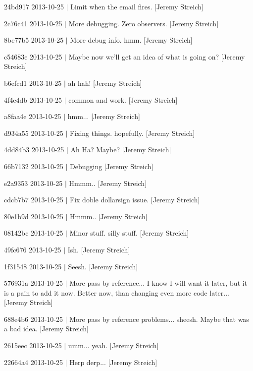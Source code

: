 \begin{DoxyItemize}
\item 24bd917 2013-\/10-\/25 $|$ Limit when the email fires. \mbox{[}Jeremy Streich\mbox{]}
\item 2c76c41 2013-\/10-\/25 $|$ More debugging. Zero observers. \mbox{[}Jeremy Streich\mbox{]}
\item 8be77b5 2013-\/10-\/25 $|$ More debug info. hmm. \mbox{[}Jeremy Streich\mbox{]}
\item c54683e 2013-\/10-\/25 $|$ Maybe now we'll get an idea of what is going on? \mbox{[}Jeremy Streich\mbox{]}
\item b6efcd1 2013-\/10-\/25 $|$ ah hah! \mbox{[}Jeremy Streich\mbox{]}
\item 4f4e4db 2013-\/10-\/25 $|$ common and work. \mbox{[}Jeremy Streich\mbox{]}
\item a8faa4e 2013-\/10-\/25 $|$ hmm... \mbox{[}Jeremy Streich\mbox{]}
\item d934a55 2013-\/10-\/25 $|$ Fixing things. hopefully. \mbox{[}Jeremy Streich\mbox{]}
\item 4dd84b3 2013-\/10-\/25 $|$ Ah Ha? Maybe? \mbox{[}Jeremy Streich\mbox{]}
\item 66b7132 2013-\/10-\/25 $|$ Debugging \mbox{[}Jeremy Streich\mbox{]}
\item e2a9353 2013-\/10-\/25 $|$ Hmmm.. \mbox{[}Jeremy Streich\mbox{]}
\item cdcb7b7 2013-\/10-\/25 $|$ Fix doble dollarsign issue. \mbox{[}Jeremy Streich\mbox{]}
\item 80e1b9d 2013-\/10-\/25 $|$ Hmmm.. \mbox{[}Jeremy Streich\mbox{]}
\item 08142bc 2013-\/10-\/25 $|$ Minor stuff. silly stuff. \mbox{[}Jeremy Streich\mbox{]}
\item 49fc676 2013-\/10-\/25 $|$ Ish. \mbox{[}Jeremy Streich\mbox{]}
\item 1f31548 2013-\/10-\/25 $|$ Seesh. \mbox{[}Jeremy Streich\mbox{]}
\item 576931a 2013-\/10-\/25 $|$ More pass by reference... I know I will want it later, but it is a pain to add it now. Better now, than changing even more code later... \mbox{[}Jeremy Streich\mbox{]}
\item 688e4b6 2013-\/10-\/25 $|$ More pass by reference problems... sheesh. Maybe that was a bad idea. \mbox{[}Jeremy Streich\mbox{]}
\item 2615eec 2013-\/10-\/25 $|$ umm... yeah. \mbox{[}Jeremy Streich\mbox{]}
\item 22664a4 2013-\/10-\/25 $|$ Herp derp... \mbox{[}Jeremy Streich\mbox{]}

\end{DoxyItemize}
